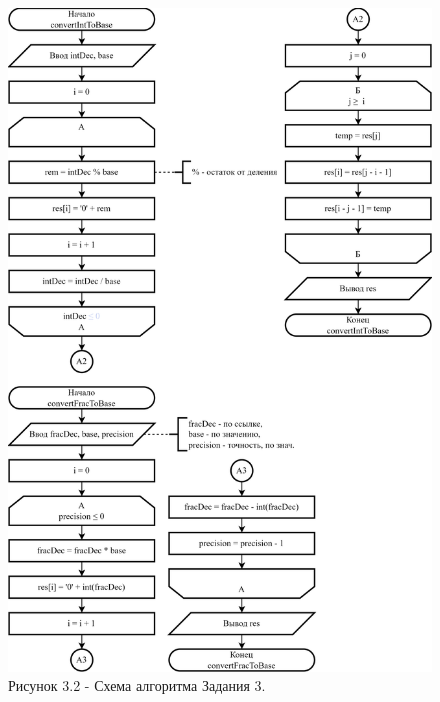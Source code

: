 \documentclass[oneside,a4paper,14pt]{extarticle} %
\begin{document}
\begin{figure}[!ht]
	\centering
	\includegraphics[height=0.9\textheight]{pics/3-flowchart-p2.png}
	\caption*{Рисунок 3.2 - Схема алгоритма Задания 3.}
\end{figure}
\newpage
\end{document}
